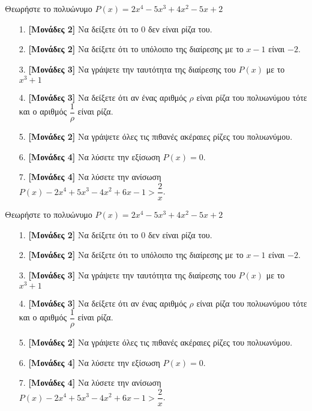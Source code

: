 \documentclass[12pt]{article}
\begin{document}
\part*{}

Θεωρήστε το πολυώνυμο $P(x)=2x^4-5x^3+4x^2-5x+2$
\begin{enumerate}
 \item[1.] \textbf{[Μονάδες 2]} Να δείξετε ότι το 0 δεν είναι ρίζα του.
 \item[2.] \textbf{[Μονάδες 2]} Να δείξετε ότι το υπόλοιπο της διαίρεσης με το $x-1$ είναι $-2$.
 \item[3.] \textbf{[Μονάδες 3]} Να γράψετε την ταυτότητα της διαίρεσης του $P(x)$ με το $x^3+1$
 \item[4.] \textbf{[Μονάδες 3]} Να δείξετε ότι αν ένας αριθμός $ρ$ είναι ρίζα του πολυωνύμου τότε και ο αριθμός $\dfrac{1}{ρ}$ είναι ρίζα.
 \item[5.] \textbf{[Μονάδες 2]} Να γράψετε όλες τις πιθανές ακέραιες ρίζες του πολυωνύμου.
 \item[6.] \textbf{[Μονάδες 4]} Να λύσετε την εξίσωση $P(x)=0$.
 \item[7.] \textbf{[Μονάδες 4]} Να λύσετε την ανίσωση $P(x)-2x^4+5x^3-4x^2+6x-1>\dfrac{2}{x}$.
\end{enumerate}

\pagebreak


Θεωρήστε το πολυώνυμο $P(x)=2x^4-5x^3+4x^2-5x+2$
\begin{enumerate}
 \item[1.] \textbf{[Μονάδες 2]} Να δείξετε ότι το 0 δεν είναι ρίζα του.
 \item[2.] \textbf{[Μονάδες 2]} Να δείξετε ότι το υπόλοιπο της διαίρεσης με το $x-1$ είναι $-2$.
 \item[3.] \textbf{[Μονάδες 3]} Να γράψετε την ταυτότητα της διαίρεσης του $P(x)$ με το $x^3+1$
 \item[4.] \textbf{[Μονάδες 3]} Να δείξετε ότι αν ένας αριθμός $ρ$ είναι ρίζα του πολυωνύμου τότε και ο αριθμός $\dfrac{1}{ρ}$ είναι ρίζα.
 \item[5.] \textbf{[Μονάδες 2]} Να γράψετε όλες τις πιθανές ακέραιες ρίζες του πολυωνύμου.
 \item[6.] \textbf{[Μονάδες 4]} Να λύσετε την εξίσωση $P(x)=0$.
 \item[7.] \textbf{[Μονάδες 4]} Να λύσετε την ανίσωση $P(x)-2x^4+5x^3-4x^2+6x-1>\dfrac{2}{x}$.
\end{enumerate}

\part*{}
\end{document}

